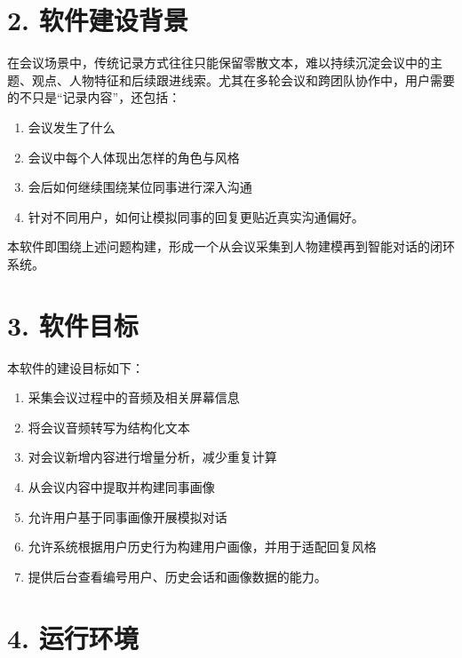 \documentclass[12pt,a4paper]{article}
\begin{document}
\section*{2. 软件建设背景}
\vspace{0.45em}
在会议场景中，传统记录方式往往只能保留零散文本，难以持续沉淀会议中的主题、观点、人物特征和后续跟进线索。尤其在多轮会议和跨团队协作中，用户需要的不只是“记录内容”，还包括：\par
\vspace{0.45em}
\newpage
{}
\fancyhead[R]{}
\begin{enumerate}
\item 会议发生了什么
\item 会议中每个人体现出怎样的角色与风格
\item 会后如何继续围绕某位同事进行深入沟通
\item 针对不同用户，如何让模拟同事的回复更贴近真实沟通偏好。
\end{enumerate}
\vspace{0.45em}
本软件即围绕上述问题构建，形成一个从会议采集到人物建模再到智能对话的闭环系统。\par
\vspace{0.45em}
\section*{3. 软件目标}
\vspace{0.45em}
本软件的建设目标如下：\par
\vspace{0.45em}
\begin{enumerate}
\item 采集会议过程中的音频及相关屏幕信息
\item 将会议音频转写为结构化文本
\item 对会议新增内容进行增量分析，减少重复计算
\item 从会议内容中提取并构建同事画像
\item 允许用户基于同事画像开展模拟对话
\item 允许系统根据用户历史行为构建用户画像，并用于适配回复风格
\item 提供后台查看编号用户、历史会话和画像数据的能力。
\end{enumerate}
\vspace{0.45em}
\section*{4. 运行环境}
\vspace{0.45em}
\end{document}
